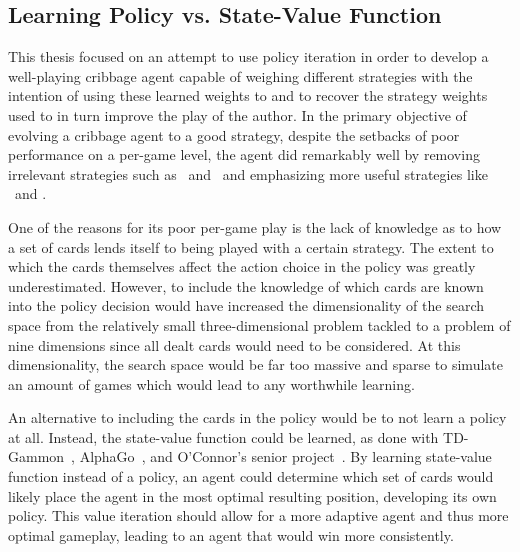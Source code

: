
\subsection{Learning Policy vs. State-Value Function}
\label{sec:disc-value}

This thesis focused on an attempt to use policy iteration
in order to develop a well-playing
cribbage agent capable of weighing different strategies
with the intention of using these learned weights to 
and to recover the strategy weights used to in turn
improve the play of the author.
%
In the primary objective of evolving a cribbage agent to a good strategy,
despite the setbacks of poor performance on a per-game level,
the agent did remarkably well
by removing irrelevant strategies
such as \handmaxmed\ and \peggingmaxmedgained\ 
and emphasizing more useful strategies
like \handmaxavg\ and \handmaxmin.

One of the reasons for its poor per-game play
is the lack of knowledge as to how a set of cards lends itself to being played
with a certain strategy.
%
The extent to which the cards themselves affect the action choice in the policy
was greatly underestimated.
%
However,
to include the knowledge of which cards are known into the policy decision
would have increased the dimensionality of the search space from the relatively
small three-dimensional problem tackled to a problem of nine dimensions since
all dealt cards would need to be considered.
%
At this dimensionality,
the search space would be far too massive and sparse to simulate an amount of
games which would lead to any worthwhile learning.

An alternative to including the cards in the policy would be to not learn a
policy at all.
%
Instead,
the state-value function could be learned,
as done with TD-Gammon~\cite{tdgammon},
AlphaGo~\cite{deepmind_alphago,deepmind_alphago_zero},
and O'Connor's senior project~\cite{roconnor_cs486}.
%
By learning state-value function instead of a policy,
an agent could determine which set of cards would likely place the agent in the
most optimal resulting position,
developing its own policy.
%
This value iteration should allow for a more adaptive agent and thus more
optimal gameplay,
leading to an agent that would win more consistently.

%
